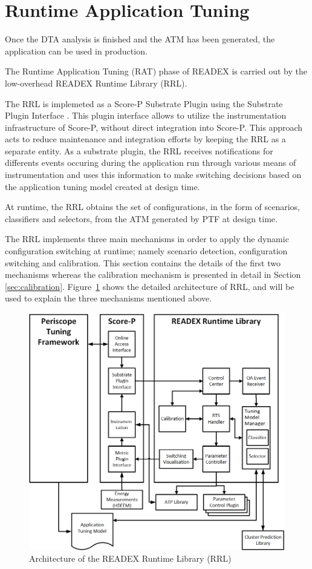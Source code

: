 \section{Runtime Application Tuning} \label{rat}

Once the DTA analysis is finished and the ATM has been generated, the application can be used in production. 

The Runtime Application Tuning (RAT) phase of READEX is carried out by the low-overhead READEX Runtime Library (RRL). 

The RRL is implemeted as a Score-P Substrate Plugin using the Substrate Plugin Interface \cite{Schoene2017}. This plugin interface allows to utilize the instrumentation infrastructure of Score-P, without direct integration into Score-P. This approach acts to reduce maintenance and integration efforts by keeping the RRL as a separate entity. As a substrate plugin, the RRL receives notifications for differents events occuring during the application run through various means of instrumentation and uses this information to make switching decisions based on the application tuning model created at design time.

At runtime, the RRL obtains the set of configurations, in the form of scenarios, classifiers and selectors, from the ATM generated by PTF at design time.

The RRL implements three main mechanisms in order to apply the dynamic configuration switching at runtime; namely scenario detection, configuration switching and calibration. This section contains the details of the first two mechanisms whereas the calibration mechanism is presented in detail in Section \ref{sec:calibration}.
Figure~\ref{fig:rrl} shows the detailed architecture of RRL, and will be used to explain the three mechanisms mentioned above. 

\begin{figure}[!t]
\centering
\includegraphics[width=.8\columnwidth]{figures/RRL_Architecture.png}
\caption{Architecture of the READEX Runtime Library (RRL)}
\label{fig:rrl}
\end{figure}

